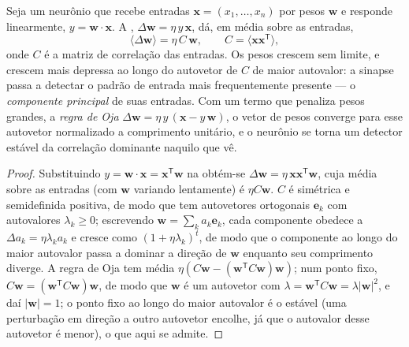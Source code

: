 \begin{theorem}\label{thm:b3:learning-memory:hebb}
Seja um neurônio que recebe entradas $\mathbf{x} = (x_{1},\dots,x_{n})$
por pesos $\mathbf{w}$ e responde linearmente, $y = \mathbf{w}\cdot\mathbf{x}$. A , $\Delta\mathbf{w} = \eta\, y\,\mathbf{x}$, dá, em média sobre as entradas,
\[
\langle\Delta\mathbf{w}\rangle = \eta\,C\,\mathbf{w}, \qquad C =
\langle\mathbf{x}\mathbf{x}^{\mathsf{T}}\rangle ,
\]
onde $C$ é a matriz de correlação das entradas. Os pesos crescem sem
limite, e crescem mais depressa ao longo do autovetor de $C$ de maior
autovalor: a sinapse passa a detectar o padrão de entrada mais
frequentemente presente --- o \emph{componente principal} de suas
entradas. Com um termo que penaliza pesos grandes, a \emph{regra de
Oja} $\Delta\mathbf{w} = \eta\, y\,(\mathbf{x} - y\,\mathbf{w})$, o
vetor de pesos converge para esse autovetor normalizado a comprimento
unitário, e o neurônio se torna um detector estável da correlação
dominante naquilo que vê.
\end{theorem}
\begin{proof}
Substituindo $y = \mathbf{w}\cdot\mathbf{x} = \mathbf{x}^{\mathsf{T}}
\mathbf{w}$ na  obtém-se $\Delta\mathbf{w} = \eta\,\mathbf{x}
\mathbf{x}^{\mathsf{T}}\mathbf{w}$, cuja média sobre as
entradas (com $\mathbf{w}$ variando lentamente) é $\eta C\mathbf{w}$. $C$
é simétrica e semidefinida positiva, de modo que tem autovetores
ortogonais $\mathbf{e}_{k}$ com autovalores $\lambda_{k} \ge 0$;
escrevendo $\mathbf{w} = \sum_{k}
a_{k}\mathbf{e}_{k}$, cada componente
obedece a $\Delta a_{k} = \eta\lambda_{k}
a_{k}$ e cresce como $(1 + \eta\lambda_{k})^{t}$, de modo que o componente ao longo do maior
autovalor passa a dominar a direção de $\mathbf{w}$ enquanto seu
comprimento diverge. A regra de Oja tem média $\eta(C\mathbf{w} -
(\mathbf{w}^{\mathsf{T}}C\mathbf{w})\mathbf{w})$; num ponto fixo,
$C\mathbf{w} = (\mathbf{w}^{\mathsf{T}}C\mathbf{w})\mathbf{w}$, de modo
que $\mathbf{w}$ é um autovetor com $\lambda = \mathbf{w}^{\mathsf{T}}
C\mathbf{w} = \lambda|\mathbf{w}|^{2}$, e daí $|\mathbf{w}| = 1$; o
ponto fixo ao longo do maior autovalor é o estável (uma perturbação em
direção a outro autovetor encolhe, já que o autovalor desse autovetor é
menor), o que aqui se admite.
\end{proof}

